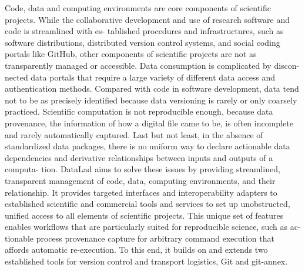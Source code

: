 Code, data and computing environments are core components of scientific projects. While
the collaborative development and use of research software and code is streamlined with es-
tablished procedures and infrastructures, such as software distributions, distributed version
control systems, and social coding portals like GitHub, other components of scientific projects
are not as transparently managed or accessible. Data consumption is complicated by discon-
nected data portals that require a large variety of different data access and authentication
methods. Compared with code in software development, data tend not to be as precisely
identified because data versioning is rarely or only coarsely practiced. Scientific computation
is not reproducible enough, because data provenance, the information of how a digital file
came to be, is often incomplete and rarely automatically captured. Last but not least, in
the absence of standardized data packages, there is no uniform way to declare actionable
data dependencies and derivative relationships between inputs and outputs of a computa-
tion. DataLad aims to solve these issues by providing streamlined, transparent management
of code, data, computing environments, and their relationship. It provides targeted interfaces
and interoperability adapters to established scientific and commercial tools and services to
set up unobstructed, unified access to all elements of scientific projects. This unique set of
features enables workflows that are particularly suited for reproducible science, such as ac-
tionable process provenance capture for arbitrary command execution that affords automatic
re-execution. To this end, it builds on and extends two established tools for version control
and transport logistics, Git and git-annex.

